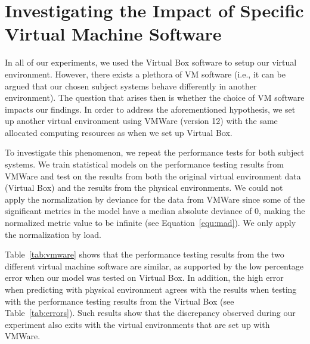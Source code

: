 \section{Investigating the Impact of Specific Virtual Machine Software}

In all of our experiments, we used the Virtual Box software to setup our virtual environment. However, there exists a plethora of VM software (i.e., it can be argued that our chosen subject systems behave differently in another environment). The question that arises then is whether the choice of VM software impacts our findings. In order to address the aforementioned hypothesis, we set up another virtual environment using VMWare (version 12) with the same allocated computing resources as when we set up Virtual Box.

To investigate this phenomenon, we repeat the performance tests for both subject systems. We train statistical models on the performance testing results from VMWare and test on the results from both the original virtual environment data (Virtual Box) and the results from the physical environments. We could not apply the normalization by deviance for the data from VMWare since some of the significant metrics in the model have a median absolute deviance of 0, making the normalized metric value to be infinite (see Equation~\ref{equ:mad}). We only apply the normalization by load. 

Table~\ref{tab:vmware} shows that the performance testing results from the two different virtual machine software are similar, as supported by the low percentage error when our model was tested on Virtual Box. In addition, the high error when predicting with physical environment agrees with the results when testing with the performance testing results from the Virtual Box (see Table~\ref{tab:errors}). Such results show that the discrepancy observed during our experiment also exits with the virtual environments that are set up with VMWare.

\begin{table}[tbh]
	\centering
	\caption{Median absolute percentage error from building a model using VMWare data.}
	\label{tab:vmware}
	\end{table}
	
